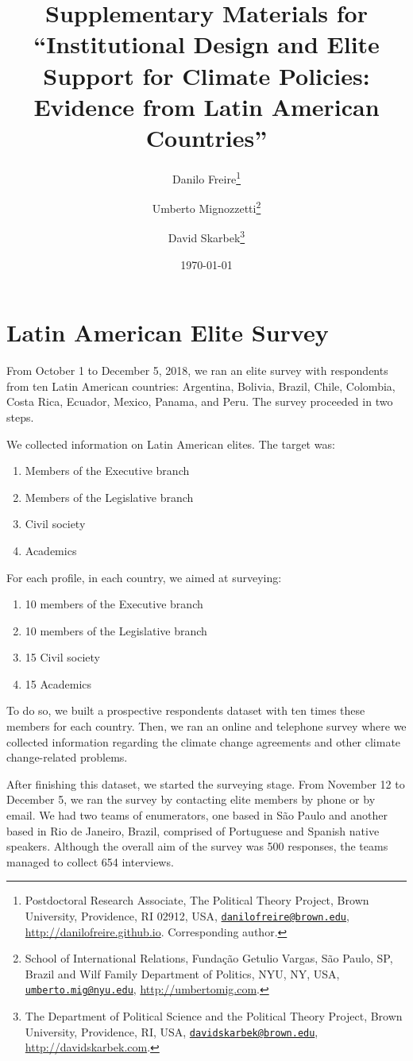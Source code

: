 \documentclass[12pt,a4paper,]{article}
\title{Supplementary Materials for ``Institutional Design and Elite Support for
Climate Policies: Evidence from Latin American Countries''}
\author{Danilo Freire\footnote{Postdoctoral Research Associate, The Political
  Theory Project, Brown University, Providence, RI 02912, USA,
  \href{mailto:danilofreire@brown.edu}{\nolinkurl{danilofreire@brown.edu}},
  \url{http://danilofreire.github.io}. Corresponding author.} \and Umberto Mignozzetti\footnote{School of International Relations, Fundação
  Getulio Vargas, São Paulo, SP, Brazil and Wilf Family Department of
  Politics, NYU, NY, USA,
  \href{mailto:umberto.mig@nyu.edu}{\nolinkurl{umberto.mig@nyu.edu}},
  \url{http://umbertomig.com}.} \and David Skarbek\footnote{The Department of Political Science and the
  Political Theory Project, Brown University, Providence, RI, USA,
  \href{mailto:davidskarbek@brown.edu}{\nolinkurl{davidskarbek@brown.edu}},
  \url{http://davidskarbek.com}.}}
\date{\today}
\providecommand{\tightlist}{%
   \setlength{\itemsep}{0pt}\setlength{\parskip}{0pt}}
\begin{document}
\maketitle



{
\hypersetup{linkcolor=black}
\setcounter{tocdepth}{2}
\tableofcontents
}
\hypertarget{latin-american-elite-survey}{%
\section{\texorpdfstring{Latin American Elite Survey
\label{sec:latam}}{Latin American Elite Survey }}\label{latin-american-elite-survey}}

\setlength{\parindent}{1cm}
\setlength{\parskip}{0pt}

From October 1 to December 5, 2018, we ran an elite survey with
respondents from ten Latin American countries: Argentina, Bolivia,
Brazil, Chile, Colombia, Costa Rica, Ecuador, Mexico, Panama, and Peru.
The survey proceeded in two steps.

We collected information on Latin American elites. The target was:

\begin{enumerate}
\def\labelenumi{\arabic{enumi}.}
\tightlist
\item
  Members of the Executive branch
\item
  Members of the Legislative branch
\item
  Civil society
\item
  Academics
\end{enumerate}

For each profile, in each country, we aimed at surveying:

\begin{enumerate}
\def\labelenumi{\arabic{enumi}.}
\tightlist
\item
  10 members of the Executive branch
\item
  10 members of the Legislative branch
\item
  15 Civil society
\item
  15 Academics
\end{enumerate}

To do so, we built a prospective respondents dataset with ten times
these members for each country. Then, we ran an online and telephone
survey where we collected information regarding the climate change
agreements and other climate change-related problems.

After finishing this dataset, we started the surveying stage. From
November 12 to December 5, we ran the survey by contacting elite members
by phone or by email. We had two teams of enumerators, one based in São
Paulo and another based in Rio de Janeiro, Brazil, comprised of
Portuguese and Spanish native speakers. Although the overall aim of the
survey was 500 responses, the teams managed to collect 654 interviews.
\end{document}
